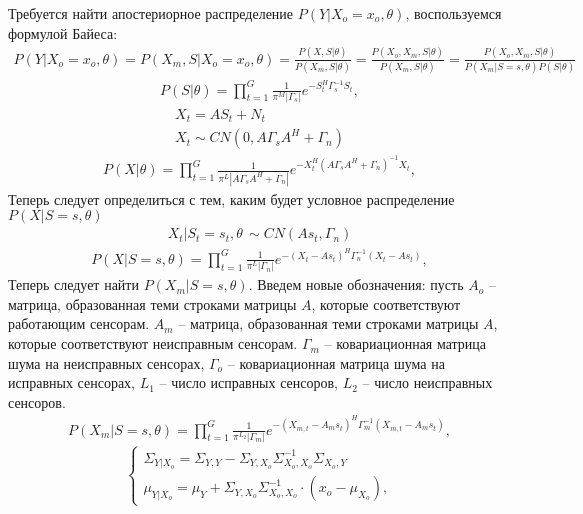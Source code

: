 \documentclass[11pt]{article}
\begin{document}
\begin{center}
\fontsize{16}{20}\selectfont {}
\end{center}
Требуется найти апостериорное распределение $P(Y|X_o=x_o,\theta)$, воспользуемся формулой Байеса:
\begin{gather}
P(Y|X_o=x_o,\theta) = P(X_m, S|X_o=x_o,\theta) = \frac{P(X, S|\theta)}{P(X_m, S|\theta)} = \frac{P(X_o, X_m, S|\theta)}{P(X_m, S|\theta)} = \frac{P(X_o, X_m, S|\theta)}{P(X_m|S=s, \theta)P(S|\theta)} 
\end{gather}
\begin{gather}
P(S|\theta) = \prod_{t=1}^G \frac{1}{\pi^M |\Gamma_s|}e^{-S_t^H\Gamma_s^{-1}S_t},
\end{gather}
\begin{gather*}
X_t = AS_t + N_t \\
X_t \sim CN(0, A\Gamma_s A^H + \Gamma_n)
\end{gather*}
\begin{gather}
P(X|\theta) = \prod_{t=1}^G \frac{1}{\pi^L |A\Gamma_s  A^H + \Gamma_n|}e^{-X_t^H (A\Gamma_s A^H + \Gamma_n)^{-1}X_t},
\end{gather}
Теперь следует определиться с тем, каким будет условное распределение $P(X|S=s, \theta)$
\begin{gather*}
X_t|S_t=s_t, \theta \, \sim CN(A s_t, \Gamma_n)
\end{gather*}
\begin{gather}
P(X|S=s,\theta) = \prod_{t=1}^G \frac{1}{\pi^L |\Gamma_n|}e^{-(X_t-A s_t)^H \Gamma_n^{-1}(X_t-A s_t)},
\end{gather}
Теперь следует найти $P(X_m|S=s, \theta)$. Введем новые обозначения: пусть $A_o$ -- матрица, образованная теми строками матрицы $A$, которые соответствуют работающим сенсорам. $A_m$ -- матрица, образованная теми строками матрицы $A$, которые соответствуют неисправным сенсорам. $\Gamma_m$ -- ковариационная матрица шума на неисправных сенсорах,  $\Gamma_o$ -- ковариационная матрица шума на исправных сенсорах, $L_1$ -- число исправных сенсоров, $L_2$ -- число неисправных сенсоров.
\begin{gather}
P(X_m|S=s,\theta) = \prod_{t=1}^G \frac{1}{\pi^{L_2} |\Gamma_m|}e^{-(X_{m,t}-A_m s_t)^H \Gamma_m^{-1}(X_{m,t}-A_m s_t)},
\end{gather}
\begin{equation}
\left\{ \begin{gathered} 
\Sigma_{Y|X_o} = \Sigma_{Y,Y}-\Sigma_{Y,X_o}\Sigma_{X_o,X_o}^{-1}\Sigma_{X_o,Y} \\
\mu_{Y|X_o} = \mu_{Y} + \Sigma_{Y,X_o}\Sigma_{X_o,X_o}^{-1}\cdot(x_o-\mu_{X_o}),
\end{gathered} \right.
\end{equation}
\end{document}
